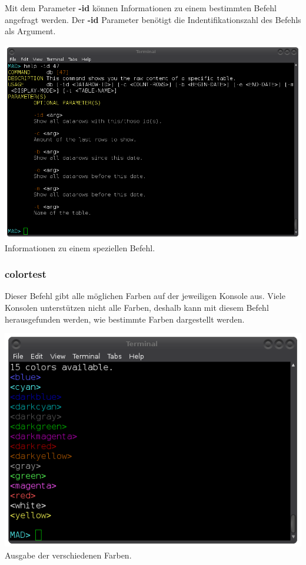 \documentclass[12pt,a4paper]{report}
\begin{document}
Mit dem Parameter \textbf{-id} können Informationen zu einem bestimmten Befehl angefragt werden. Der \textbf{-id} Parameter benötigt die Indentifikationszahl des Befehls als Argument.

\begin{center}
\includegraphics[scale=0.5]{img/cli_help_id.png}\\
Informationen zu einem speziellen Befehl.
\end{center}

\subsubsection{colortest}

Dieser Befehl gibt alle möglichen Farben auf der jeweiligen Konsole aus. Viele Konsolen unterstützen nicht alle Farben, deshalb kann mit diesem Befehl herausgefunden werden, wie bestimmte Farben dargestellt werden.

\begin{center}
\includegraphics[scale=0.5]{img/cli_colortest.png}\\
Ausgabe der verschiedenen Farben.
\end{center}
\end{document}
